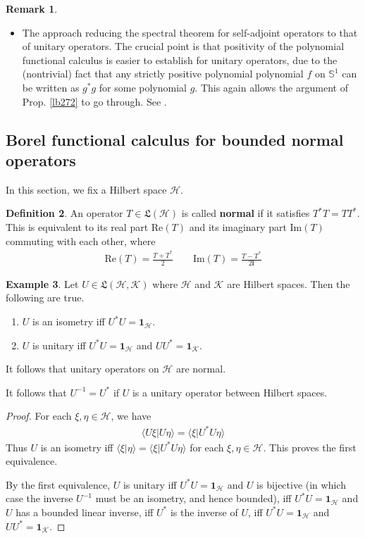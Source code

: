 \documentclass[12pt,b5paper,notitlepage]{article}
\theoremstyle{definition}
\newtheorem{df}{Definition}[subsection]
\newtheorem{eg}[df]{Example}
\newtheorem{rem}[df]{Remark}
\theoremstyle{plain}
\newcommand{\fk}{\mathfrak}
\newcommand{\idt}{\mathbf{1}}
\newcommand{\bk}[1]{\langle {#1}\rangle}
\newcommand{\im}{\mathbf{i}}
\newcommand{\Sbb}{{\mathbb S}}
\newcommand{\Real}{\mathrm{Re}}
\newcommand{\Imag}{\mathrm{Im}}
\newcommand{\MH}{\mathcal H}
\newcommand{\MK}{\mathcal K}
\newcommand{\hqed}{\hfill\qedsymbol}
\numberwithin{equation}{section}
\begin{document}
\begin{rem}
\begin{itemize}
\item The approach reducing the spectral theorem for self-adjoint operators to that of unitary operators. The crucial point is that positivity of the polynomial functional calculus is easier to establish for unitary operators, due to the (nontrivial) fact that any strictly positive polynomial polynomial $f$ on $\Sbb^1$ can be written as $g^*g$ for some polynomial $g$. This again allows the argument of Prop. \ref{lb272} to go through. See \cite{Xia}.
\end{itemize}
\hqed 
\end{rem}








\subsection{Borel functional calculus for bounded normal operators}\label{lb259}


In this section, we fix a Hilbert space $\MH$.

\begin{df}
An operator $T\in\fk L(\MH)$ is called \textbf{normal}  if it satisfies $T^*T=TT^*$. This is equivalent to its real part $\Real(T)$  and its imaginary part $\Imag(T)$  commuting with each other, where
\begin{align*}
\Real(T)=\frac{T+T^*}2\qquad \Imag(T)=\frac{T-T^*}{2\im}
\end{align*}
\end{df}


\begin{eg}\label{lb311}
Let $U\in\fk L(\MH,\MK)$ where $\MH$ and $\MK$ are Hilbert spaces. Then the following are true.
\begin{enumerate}
\item $U$ is an isometry iff $U^*U=\idt_\MH$.
\item $U$ is unitary iff $U^*U=\idt_\MH$ and $UU^*=\idt_\MK$.
\end{enumerate}
It follows that unitary operators on $\MH$ are normal.
\end{eg}

It follows that $U^{-1}=U^*$ if $U$ is a unitary operator between Hilbert spaces.

\begin{proof}
For each $\xi,\eta\in\MH$, we have
\begin{align*}
\bk{U\xi|U\eta}=\bk{\xi|U^*U\eta}
\end{align*}
Thus $U$ is an isometry iff $\bk{\xi|\eta}=\bk{\xi|U^*U\eta}$ for each $\xi,\eta\in\MH$. This proves the first equivalence.

By the first equivalence, $U$ is unitary iff $U^*U=\idt_\MH$ and $U$ is bijective (in which case the inverse $U^{-1}$ must be an isometry, and hence bounded), iff $U^*U=\idt_\MH$ and $U$ has a bounded linear inverse, iff $U^*$ is the inverse of $U$, iff $U^*U=\idt_\MH$ and $UU^*=\idt_\MK$.
\end{proof}
\end{document}

